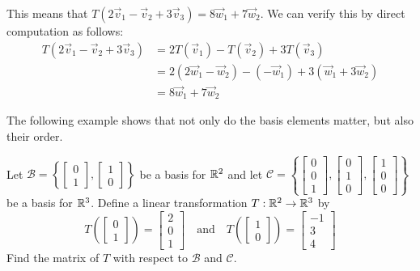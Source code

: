 \documentclass{ximera}
\begin{document}
\begin{example}
\begin{explanation}
This means that $T(2\vec{v}_1-\vec{v}_2+3\vec{v}_3)=8\vec{w}_1+7\vec{w}_2$.
We can verify this by direct computation as follows:
\begin{align*}
T(2\vec{v}_1-\vec{v}_2+3\vec{v}_3)&=2T(\vec{v}_1)-T(\vec{v}_2)+3T(\vec{v}_3)\\&=2(2\vec{w}_1-\vec{w}_2)-(-\vec{w}_1)+3(\vec{w}_1+3\vec{w}_2)\\&=8\vec{w}_1+7\vec{w}_2
\end{align*}
\end{explanation}

\end{example}

The following example shows that not only do the basis elements matter, but also their order.
\begin{example}\label{ex:transmatrix2}
Let $\mathcal{B}=\left\{\begin{bmatrix}0\\1\end{bmatrix},\begin{bmatrix}1\\0\end{bmatrix}\right\}$ be a basis for $\mathbb{R}^2$ and let $\mathcal{C}=\left\{\begin{bmatrix}0\\0\\1\end{bmatrix},\begin{bmatrix}0\\1\\0\end{bmatrix}, \begin{bmatrix}1\\0\\0\end{bmatrix}\right\}$ be a basis for $\mathbb{R}^3$.  Define a linear transformation $T:\mathbb{R}^2\rightarrow \mathbb{R}^3$ by 
$$T\left(\begin{bmatrix}0\\1\end{bmatrix}\right)=\begin{bmatrix}2\\0\\1\end{bmatrix}\quad\text{and}\quad T\left(\begin{bmatrix}1\\0\end{bmatrix}\right)=\begin{bmatrix}-1\\3\\4\end{bmatrix}$$
Find the matrix of $T$ with respect to $\mathcal{B}$ and $\mathcal{C}$.


\end{example}
\end{document}
